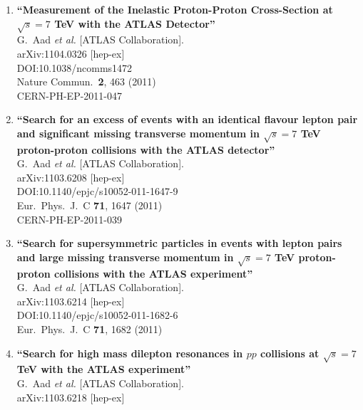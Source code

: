 \documentclass{article}
\begin{document}
\begin{enumerate}
\item%
{\bf ``Measurement of the Inelastic Proton-Proton Cross-Section at $\sqrt{s}=7$ TeV with the ATLAS Detector''}
  \\{}G.~Aad {\it et al.} [ATLAS Collaboration].
  \\{}arXiv:1104.0326 [hep-ex]
  \\{}DOI:10.1038/ncomms1472
  \\{}Nature Commun.\  {\bf 2}, 463 (2011)
  \\{}CERN-PH-EP-2011-047
\item%
{\bf ``Search for an excess of events with an identical flavour lepton pair and significant missing transverse momentum in $\sqrt{s}=7$ TeV proton-proton collisions with the ATLAS detector''}
  \\{}G.~Aad {\it et al.} [ATLAS Collaboration].
  \\{}arXiv:1103.6208 [hep-ex]
  \\{}DOI:10.1140/epjc/s10052-011-1647-9
  \\{}Eur.\ Phys.\ J.\ C {\bf 71}, 1647 (2011)
  \\{}CERN-PH-EP-2011-039
\item%
{\bf ``Search for supersymmetric particles in events with lepton pairs and large missing transverse momentum in $\sqrt{s}=7$ TeV proton-proton collisions with the ATLAS experiment''}
  \\{}G.~Aad {\it et al.} [ATLAS Collaboration].
  \\{}arXiv:1103.6214 [hep-ex]
  \\{}DOI:10.1140/epjc/s10052-011-1682-6
  \\{}Eur.\ Phys.\ J.\ C {\bf 71}, 1682 (2011)
\item%
{\bf ``Search for high mass dilepton resonances in $pp$ collisions at $\sqrt{s}=7$ TeV with the ATLAS experiment''}
  \\{}G.~Aad {\it et al.} [ATLAS Collaboration].
  \\{}arXiv:1103.6218 [hep-ex]

\end{enumerate}
\end{document}
